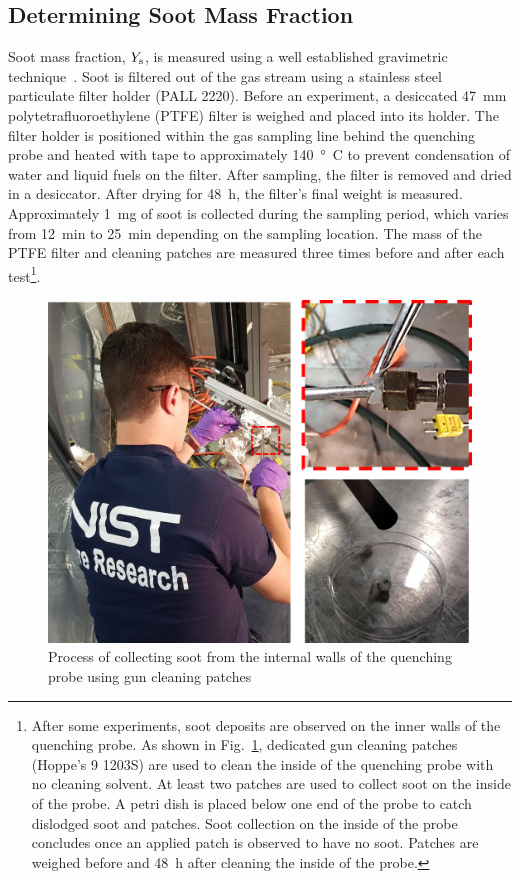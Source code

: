 \documentclass[12pt]{article}
\begin{document}
\subsection{Determining Soot Mass Fraction}
\label{ssec:Soot_Setup}

Soot mass fraction, $Y_{\rm s}$, is measured using a well established gravimetric technique~\cite{Choi1995}. Soot is filtered out of the gas stream using a stainless steel particulate filter holder (PALL 2220).  Before an experiment, a desiccated \SI{47}{mm} polytetrafluoroethylene (PTFE) filter is weighed and placed into its holder. The filter holder is positioned within the gas sampling line behind the quenching probe and heated with tape to approximately \SI{140}{\degree C} to prevent condensation of water and liquid fuels on the filter. After sampling, the filter is removed and dried in a desiccator. After drying for 48~h, the filter’s final weight is measured. Approximately \SI{1}{mg} of soot is collected during the sampling period, which varies from 12~min to 25~min depending on the sampling location. The mass of the PTFE filter and cleaning patches are measured three times before and after each test\footnote{After some experiments, soot deposits are observed on the inner walls of the quenching probe. As shown in Fig.~\ref{fig:Soot_Probe_Setup}, dedicated gun cleaning patches (Hoppe's 9 1203S) are used to clean the inside of the quenching probe with no cleaning solvent. At least two patches are used to collect soot on the inside of the probe. A petri dish is placed below one end of the probe to catch dislodged soot and patches. Soot collection on the inside of the probe concludes once an applied patch is observed to have no soot. Patches are weighed before and 48~h after cleaning the inside of the probe.}.

\begin{figure}[ht!]
	\centering
\includegraphics[width=15.0cm,keepaspectratio]{Soot_Probe.png}
	\caption[Process for cleaning soot probe]{Process of collecting soot from the internal walls of the quenching probe using gun cleaning patches}
	\label{fig:Soot_Probe_Setup}
\end{figure}
\end{document}
